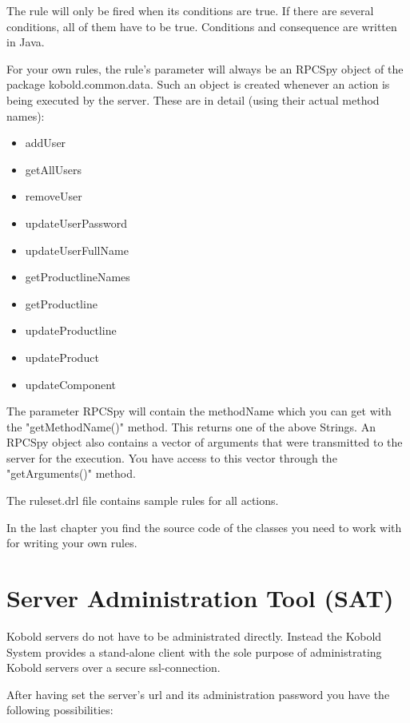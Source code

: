 The rule will only be fired when its conditions are true. If there are several conditions,
all of them have to be true. Conditions and consequence are written in Java.\par

For your own rules, the rule's parameter will always be an RPCSpy object of the package
kobold.common.data. Such an object is created whenever an action is being executed by the server.
These are in detail (using their actual method names):
\begin{itemize}
	\item addUser
	\item getAllUsers
	\item removeUser
	\item updateUserPassword
	\item updateUserFullName
	\item getProductlineNames
	\item getProductline
	\item updateProductline
	\item updateProduct
	\item updateComponent
\end{itemize}
The parameter RPCSpy will contain the methodName which you can get with the "getMethodName()" method. 
This returns one of the above Strings. An RPCSpy object also contains a vector of
arguments that were transmitted to the server for the execution. You have access to this vector through
the "getArguments()" method. \par
The ruleset.drl file contains sample rules for all actions.\par
In the last chapter you find the source code of the classes you need to work with for writing your own rules.






\section{Server Administration Tool (SAT)}

Kobold servers do not have to be administrated directly. Instead the Kobold System 
provides a stand-alone client with the sole purpose of administrating Kobold servers 
over a secure ssl-connection. \par

After having set the server's url and its administration password you have the following 
possibilities:

